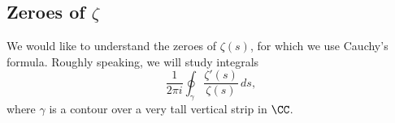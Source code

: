 \documentclass[../notes.tex]{subfiles}
\begin{document}

\subsection{Zeroes of \texorpdfstring{$\zeta$}{ Zeta}}
We would like to understand the zeroes of $\zeta(s)$, for which we use Cauchy's formula. Roughly speaking, we will study integrals
\[\frac1{2\pi i}\oint_\gamma\frac{\zeta'(s)}{\zeta(s)}\,ds,\]
where $\gamma$ is a contour over a very tall vertical strip in $\CC$.
\end{document}
